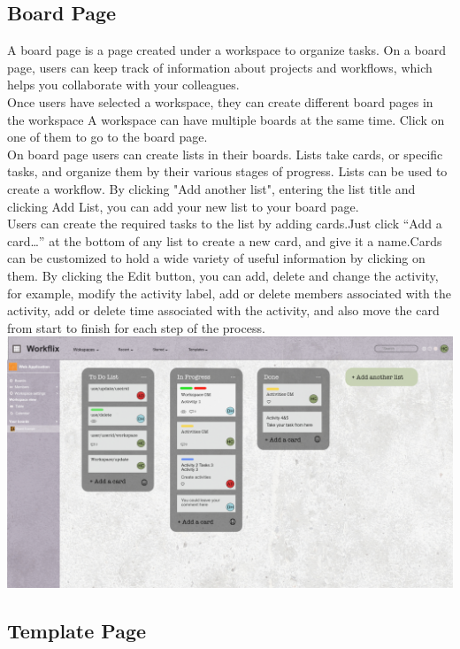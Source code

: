 \subsection{Board Page}

A board page is a page created under a workspace to organize tasks. On a board page, users can keep track of information
about projects and workflows, which helps you collaborate with your colleagues.\\

Once users have selected a workspace, they can create different board pages in the workspace A workspace can have multiple
boards at the same time. Click on one of them to go to the board page.\\

On board page users can create lists in their boards. Lists take cards, or specific tasks, and organize them by their
various stages of progress. Lists can be used to create a workflow. By clicking "Add another list", entering the list
title and clicking Add List, you can add your new list to your board page.\\

Users can create the required tasks to the list by adding cards.Just click “Add a card…” at the bottom of any list to create
a new card, and give it a name.Cards can be customized to hold a wide variety of useful information by clicking on them. By
clicking the Edit button, you can add, delete and change the activity, for example, modify the activity label, add or delete
members associated with the activity, add or delete time associated with the activity, and also move the card from start to
finish for each step of the process.
\includegraphics[width=\columnwidth]{images/Board.jpg}

\subsection{Template Page}

